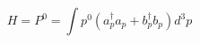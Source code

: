 \begin{equation}       
H = P^{0} = \int p^{0} (a_{p}^{\dag} a_{p} + b_{p}^{\dag} b_{p}) d^{3} p 
\end{equation}

